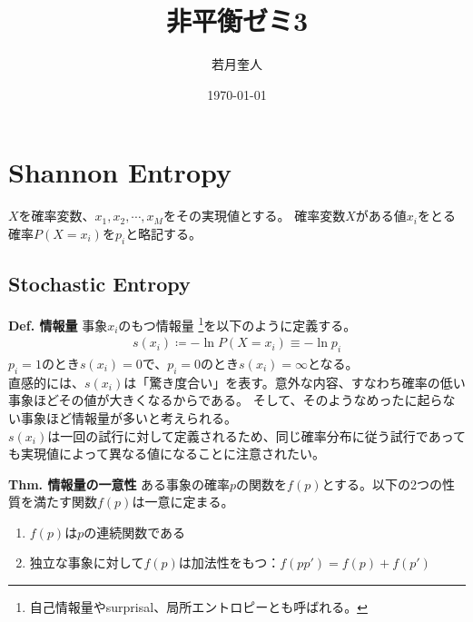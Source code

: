 \documentclass[a4paper,11pt]{jsarticle}
\begin{document}
\title{非平衡ゼミ3}
\author{若月奎人}
\date{\today}
\maketitle

\section{Shannon Entropy}
$X$を確率変数、$x_1, x_2, \cdots, x_M$をその実現値とする。
確率変数$X$がある値$x_i$をとる確率$P(X=x_i)$を$p_i$と略記する。\\

\subsection{Stochastic Entropy}
\begin{itembox}[l]{\textbf{Def. 情報量}}
事象$x_i$のもつ情報量 \footnote{自己情報量やsurprisal、局所エントロピーとも呼ばれる。}を以下のように定義する。
  \begin{align}
    s(x_i) \coloneq- \ln{P(X=x_i)} \equiv -\ln{p_i}
  \end{align}
$p_i=1$のとき$s(x_i)=0$で、$p_i=0$のとき$s(x_i) = \infty$となる。\\
直感的には、$s(x_i)$は「驚き度合い」を表す。意外な内容、すなわち確率の低い事象ほどその値が大きくなるからである。
そして、そのようなめったに起らない事象ほど情報量が多いと考えられる。\\
$s(x_i)$は一回の試行に対して定義されるため、同じ確率分布に従う試行であっても実現値によって異なる値になることに注意されたい。
\end{itembox}

\bigskip

\begin{itembox}[l]{\textbf{Thm. 情報量の一意性}}
ある事象の確率$p$の関数を$f(p)$とする。以下の2つの性質を満たす関数$f(p)$は一意に定まる。
  \begin{enumerate}
    \item $f(p)$は$p$の連続関数である
    \item 独立な事象に対して$f(p)$は加法性をもつ：$f(pp')=f(p)+f(p')$
  \end{enumerate}
\end{itembox}

\newpage
\end{document}
